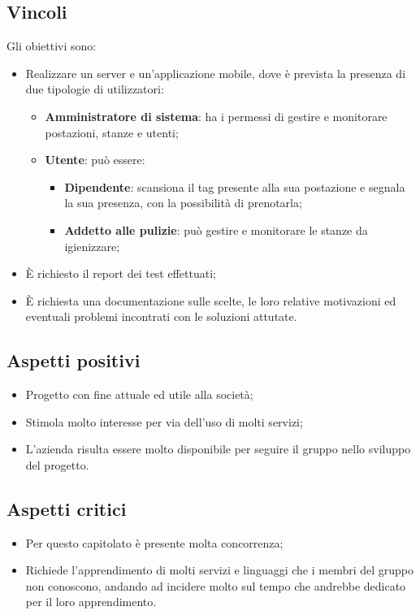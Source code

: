 \subsection{Vincoli}
Gli obiettivi sono:
\begin{itemize}
\item	Realizzare un server e un'applicazione mobile, dove è prevista la presenza di due tipologie di utilizzatori:
\begin{itemize}
\item	\textbf{Amministratore di sistema}: ha i permessi di gestire e monitorare postazioni, stanze e utenti;
\item	\textbf{Utente}: può essere:

\begin{itemize}
\item \textbf{Dipendente}: scansiona il tag presente alla sua postazione e segnala la sua presenza, con la possibilità di prenotarla;

\item \textbf{Addetto alle pulizie}: può gestire e monitorare le stanze da igienizzare;
\end{itemize}

\end{itemize}
\item	È richiesto il report dei test effettuati;
\item	È richiesta una documentazione sulle scelte, le loro relative motivazioni ed eventuali problemi incontrati con le soluzioni attutate.
\end{itemize}

\subsection{Aspetti positivi}
\begin{itemize}
\item	Progetto con fine attuale ed utile alla società;
\item	Stimola molto interesse per via dell'uso di molti servizi;
\item	L'azienda risulta essere molto disponibile per seguire il gruppo nello sviluppo del progetto.
\end{itemize}
\subsection{Aspetti critici}
\begin{itemize}
\item	Per questo capitolato è presente molta concorrenza;
\item	Richiede l'apprendimento di molti servizi e linguaggi che i membri del gruppo non conoscono, andando ad incidere molto sul tempo che andrebbe dedicato per il loro apprendimento.
\end{itemize}

